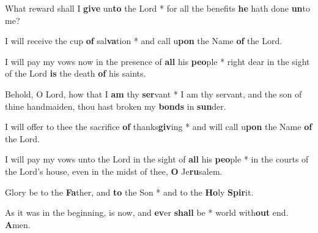 \begin{multicols}{2}
	What reward shall I \textbf{give} un\textbf{to} the Lord * for all the benefits \textbf{he} hath done \textbf{un}to me?
	
	I will receive the cup \textbf{of} sal\textbf{va}tion * and call u\textbf{pon} the Name \textbf{of} the Lord.
	
	I will pay my vows now in the presence of \textbf{all} his \textbf{peo}ple * right dear in the sight of the Lord \textbf{is} the death \textbf{of} his saints.
	
	Behold, O Lord, how that I \textbf{am} thy \textbf{ser}vant * I am thy servant, and the son of thine handmaiden, thou hast broken my \textbf{bonds} in \textbf{sun}der.
	
	I will offer to thee the sacrifice \textbf{of} thanks\textbf{giv}ing * and will call u\textbf{pon} the Name \textbf{of} the Lord.
	
	I will pay my vows unto the Lord in the sight of \textbf{all} his \textbf{peo}ple * in the courts of the Lord's house, even in the midst of thee, \textbf{O} Je\textbf{ru}salem.
	
	Glory be to the \textbf{Fa}ther, and \textbf{to} the Son * and to the \textbf{Ho}ly \textbf{Spir}it.
	
	As it was in the beginning, is now, and \textbf{ev}er \textbf{shall} be * world with\textbf{out} end. \textbf{A}men.
\end{multicols}